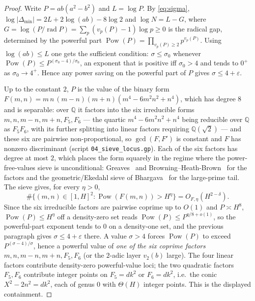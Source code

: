 \documentclass[11pt,reqno]{amsart}
\theoremstyle{plain}
\theoremstyle{definition}
\newcommand{\Q}{\mathbb{Q}}
\newcommand{\rad}{\operatorname{rad}}
\newcommand{\Pow}{\operatorname{Pow}}
\begin{document}
\begin{proof}
Write $P=ab(a^2-b^2)$ and $L=\log P$. By \eqref{eq:sigma},
$\log|\Delta_{\min}|=2L+2\log(ab)-8\log2$ and $\log N=L-G$, where
$G=\log(P/\rad P)=\sum_p(v_p(P)-1)\log p\ge0$ is the radical gap, determined by
the powerful part $\Pow(P)=\prod_{v_p(P)\ge2}p^{v_p(P)}$. Using
$\log(ab)\le L$ one gets the sufficient condition: $\sigma\le\sigma_0$ whenever
$\Pow(P)\le P^{(\sigma_0-4)/\sigma_0}$, an exponent that is positive iff
$\sigma_0>4$ and tends to $0^+$ as $\sigma_0\to4^+$. Hence any power saving on the
powerful part of $P$ gives $\sigma\le4+\varepsilon$.

Up to the constant $2$, $P$ is the value of the binary form
$F(m,n)=m\,n\,(m-n)(m+n)(m^4-6m^2n^2+n^4)$, which has degree $8$ and is separable:
over $\Q$ it factors into the six irreducible forms $m,n,m-n,m+n,F_5,F_6$ --- the
quartic $m^4-6m^2n^2+n^4$ being reducible over $\Q$ as $F_5F_6$, with its further
splitting into linear factors requiring $\Q(\sqrt2)$ --- and these six are pairwise
non-proportional, so $\gcd(F,F')$ is constant and $F$ has nonzero discriminant
(script \texttt{04\_sieve\_locus.gp}). Each of the six factors has degree at most
$2$, which places the form squarely in the regime where the power-free-values sieve
is unconditional: Greaves~\cite{greaves} and Browning--Heath-Brown~\cite{browning}
for the factors and the geometric/Ekedahl sieve of Bhargava~\cite{bhargava} for the
large-prime tail. The sieve gives, for every $\eta>0$,
\[
  \#\{(m,n)\in[1,H]^2:\Pow(F(m,n))>H^\eta\}=O_{F,\eta}(H^{2-\delta}).
\]
Since the six irreducible factors are pairwise coprime up to $O(1)$ and
$P\asymp H^8$, $\Pow(P)\le H^\eta$ off a density-zero set reads
$\Pow(P)\le P^{\eta/8+o(1)}$, so the powerful-part exponent tends to $0$ on a
density-one set, and the previous paragraph gives $\sigma\le4+\varepsilon$ there.
A value $\sigma>4$ forces $\Pow(P)$ to exceed $P^{(\sigma-4)/\sigma}$, hence a
powerful value of \emph{one of the six coprime factors} $m,n,m-n,m+n,F_5,F_6$ (or
the $2$-adic layer $v_2(b)$ large). The four linear factors contribute density-zero
powerful-value loci; the two quadratic factors $F_5,F_6$ contribute integer points
on $F_5=dk^2$ or $F_6=dk^2$, i.e.\ the conic $X^2-2n^2=dk^2$, each of genus $0$ with
$\Theta(H)$ integer points. This is the displayed containment.
\end{proof}
\end{document}

